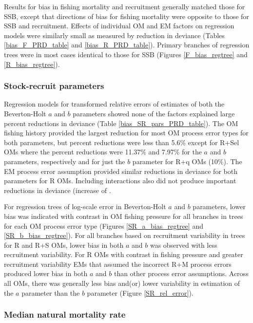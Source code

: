 \documentclass[
  12pt,
]{article}
\begin{document}
Results for bias in fishing mortality and recruitment generally matched
those for SSB, except that directions of bias for fishing mortality were
opposite to those for SSB and recruitment. Effects of individual OM and
EM factors on regression models were similarly small as measured by
reduction in deviance (Tables \ref{bias_F_PRD_table} and
\ref{bias_R_PRD_table}). Primary branches of regression trees were in
most cases identical to those for SSB (Figures \ref{F_bias_regtree} and
\ref{R_bias_regtree}).

\subsubsection*{Stock-recruit
parameters}\label{stock-recruit-parameters}

Regression models for transformed relative errors of estimates of both
the Beverton-Holt \(a\) and \(b\) parameters showed none of the factors
explained large percent reductions in deviance (Table
\ref{bias_SR_pars_PRD_table}). The OM fishing history provided the
largest reduction for most OM process error types for both parameters,
but percent reductions were less than 5.6\% except for R+Sel OMs where
the percent reductions were 11.37\% and 7.97\% for the \(a\) and \(b\)
parameters, respectively and for just the \(b\) parameter for R+q OMs
(10\%). The EM process error assumption provided similar reductions in
deviance for both parameters for R OMs. Including interactions also did
not produce important reductions in deviance (increase of .

For regression trees of log-scale error in Beverton-Holt \(a\) and \(b\)
parameters, lower bias was indicated with contrast in OM fishing
pressure for all branches in trees for each OM process error type
(Figures \ref{SR_a_bias_regtree} and \ref{SR_b_bias_regtree}). For all
branches based on recruitment variability in trees for R and R+S OMs,
lower bias in both \(a\) and \(b\) was observed with less recruitment
variability. For R OMs with contrast in fishing pressure and greater
recruitment variability EMs that assumed the incorrect R+M process
errors produced lower bias in both \(a\) and \(b\) than other process
error assumptions. Across all OMs, there was generally less bias and(or)
lower variability in estimation of the \(a\) parameter than the \(b\)
parameter (Figure \ref{SR_rel_error}).

\subsubsection*{Median natural mortality
rate}\label{median-natural-mortality-rate}
\end{document}
